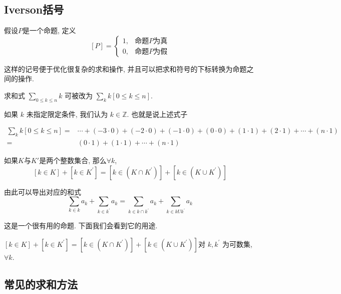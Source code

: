 \documentclass{ctexart}
\begin{document}
\subsection{Iverson括号}

\begin{definition}[Iverson 括号]
	假设$P$是一个命题, 定义
	$$
		[P]=\left\{\begin{array}{lr}
			1, & \text{命题}P\text{为真} \\
			0, & \text{命题}P\text{为假}
		\end{array}\right.
	$$
\end{definition}

这样的记号便于优化很复杂的求和操作, 并且可以把求和符号的下标转换为命题之间的操作.

\begin{example}
	求和式 $\sum_{0 \leq k \leq n} k$ 可被改为 $\sum_k k[0 \leq k \leq n]$.

	如果 $k$ 未指定限定条件, 我们认为 $k \in \mathbb{Z}$. 也就是说上述式子

	$$
		\begin{aligned}
			\sum_k k[0 \leq k \leq n]= & \cdots+(-3 \cdot 0)+(-2 \cdot 0)+(-1 \cdot 0)+(0 \cdot 0)+(1 \cdot 1)+(2 \cdot 1)+\cdots  +(n \cdot 1) \\
			=                          & (0 \cdot 1)+(1 \cdot 1)+\cdots+(n \cdot 1)
		\end{aligned}
	$$

\end{example}

\begin{example}
	如果$K$与$K'$是两个整数集合, 那么$\forall k$,
	$$
		[k \in K]+\left[k \in K^{\prime}\right]=\left[k \in\left(K \cap K^{\prime}\right)\right]+\left[k \in\left(K \cup K^{\prime}\right)\right]
	$$

	由此可以导出对应的和式
	$$
		\sum_{k \in k} a_k+\sum_{k \in k^{\prime}} a_k=\sum_{k \in k \cap k^{\prime}} a_k+\sum_{k \in k U k^{\prime}} a_k
	$$
\end{example}

这是一个很有用的命题. 下面我们会看到它的用途.

\begin{proposition}
	$[k \in K]+\left[k \in K^{\prime}\right]=\left[k \in\left(K \cap K^{\prime}\right)\right]+\left[k \in\left(K \cup K^{\prime}\right)\right]$对 $k , k^{\prime}$ 为可数集, $\forall k$.
\end{proposition}

\subsection{常见的求和方法}
\end{document}

